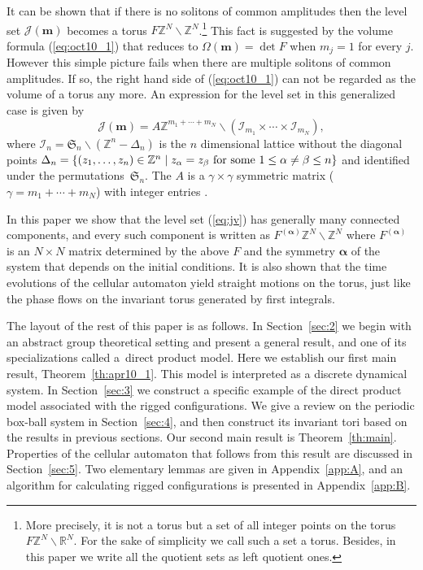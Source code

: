 \documentclass[pdftex]{sigma}
\newcommand{\Z}{{\mathbb Z}}
\newcommand{\R}{{\mathbb R}}
\newcommand{\J}{{\mathcal J}}
\newcommand\boa{\boldsymbol{\alpha}}
\newcommand{\m}{{\boldsymbol m}}
\begin{document}
{It can be shown that}
if there is no solitons of common amplitudes then
the level set $\J (\m)$ becomes a torus $F \Z^N \backslash \Z^N $.\footnote{More precisely, it is not a torus but a set of all integer points on the torus $F \Z^N \backslash \R^N $.
For the sake of simplicity we call such a set a torus.
Besides, in this paper we write all the quotient sets as left quotient ones.}
This fact is suggested by
the volume formula (\ref{eq:oct10_1}) that reduces to $\Omega(\m) =\det F$ when $m_j=1$ for every $j$.
However this simple picture fails when there are multiple solitons of common amplitudes.
{If so,} the right hand side of (\ref{eq:oct10_1}) can not be regarded as the volume of a torus any more.
{An expression for} the level set in this generalized case is given by
\begin{equation}\label{eq:jv}
\J (\m) =  A \Z^{m_1+\cdots + m_{N}} \backslash ({\mathcal I}_{m_1}\times
\cdots \times {\mathcal I}_{m_N}),
\end{equation}
where ${\mathcal I}_n = {\mathfrak S}_n \backslash (\Z^n-\Delta_n)$ is
the $n$ dimensional lattice without the diagonal
points $\Delta_n = \{(z_1,\ldots, z_n) \in \Z^n
\mid z_\alpha = z_\beta \hbox{ for some }
1 \le \alpha \neq \beta \le  n \}$
and identif\/ied under the permutations~${\mathfrak S}_n$.
The $A$ is a $\gamma \times \gamma$ symmetric matrix ($\gamma = m_1+\cdots + m_N$) with integer entries \cite{KTT}.

In this paper we show that the level set (\ref{eq:jv}) has generally many connected components, and every such component
is written as $F^{(\boa)} \Z^N \backslash \Z^N $
where $F^{(\boa)}$ is an $N \times N$ matrix
determined by the above $F$ and the symmetry $\boa$ of the system that depends on the initial conditions.
It is also shown that the time evolutions of the cellular automaton yield straight motions on the torus,
just like the phase f\/lows on the invariant torus generated by f\/irst integrals.

The layout of the rest of this paper is as follows.
In Section~\ref{sec:2} we begin with an abstract group theoretical setting and
present a general result,
and one of its specializations called a~direct product model.
Here we establish our f\/irst main result, Theorem~\ref{th:apr10_1}.
This model is interpreted as a discrete dynamical system.
In Section~\ref{sec:3} we construct a specif\/ic example of the direct product model
associated with the rigged conf\/igurations.
We give a review on the periodic box-ball system in Section~\ref{sec:4}, and then
construct its invariant tori based on the results in previous sections.
Our second main result is Theorem~\ref{th:main}.
Properties of the cellular automaton
that follows from this result are discussed in Section~\ref{sec:5}.
Two elementary lemmas are given in Appendix~\ref{app:A}, and
an algorithm for calculating rigged conf\/igurations is presented in Appendix~\ref{app:B}.
\end{document}
